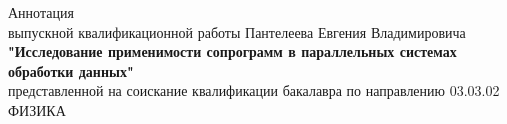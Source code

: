 \documentclass[a4paper,14pt]{extarticle}
\begin{document}
\begin{center}
	Аннотация \\
	выпускной квалификационной работы Пантелеева Евгения Владимировича
	\textbf{"Исследование применимости сопрограмм в параллельных системах обработки данных"} \\
	представленной на соискание квалификации бакалавра по направлению 03.03.02 ФИЗИКА
\end{center}

\end{document}
